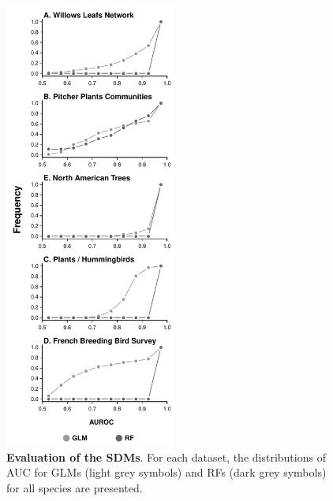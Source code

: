 \newpage

\begin{figure}
\centering
\includegraphics[width=0.50000\textwidth]{chapitre3/figS3.pdf}
\caption{\textbf{Evaluation of the SDMs}. For each dataset, the
distributions of AUC for GLMs (light grey symbols) and RFs (dark grey
symbols) for all species are presented.\label{fig:auc}}
\end{figure}

\newpage


